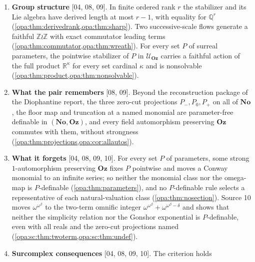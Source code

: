 \documentclass[11pt,oneside]{article}
\numberwithin{equation}{section}
\theoremstyle{definition}
\theoremstyle{remark}
\newcommand{\No}{\mathbf{No}}
\newcommand{\Oz}{\mathbf{Oz}}
\newcommand{\R}{\mathbb R}
\newcommand{\Q}{\mathbb Q}
\newcommand{\Z}{\mathbb Z}
\newcommand{\UU}{\mathcal U}
\newcommand{\Fix}{\operatorname{Fix}}
\newcommand{\Hahn}[2]{#1((t^{#2}))}
\newcommand{\src}[1]{\textup{\textsf{\small[#1]}}}
\begin{document}
\begin{enumerate}[label=\textup{(\arabic*)},leftmargin=*,itemsep=3pt]
$\Fix(\UU_\Oz)=\R$, also for all field automorphisms of $\No$ preserving $\Oz$
(\cref{opa:thm:fixed}). For every set $A$ of parameters the elementary shears
fixing $A$ have common fixed field $\Hahn\R{V_A}$, $V_A$ the rational span of
the supports (\cref{opa:thm:hull}). Binomial twists
$t^g\mapsto t^gF(t^\delta)^{\theta(g)}$ with an arbitrary profile $F$ have fixed
field $\Hahn k{\ker\theta}$, no nontrivial finite orbits and a relatively
algebraically closed fixed field
(\cref{opa:sc:thm:twists,opa:sc:thm:fixed,opa:sc:cor:relative}), and in
set-sized fields definable elements obey a
support bound (\cref{opa:sc:prop:dclset}) \src{10}.
\item \textbf{Group structure} \src{04, 08, 09}. In finite ordered rank $r$
the stabilizer and its Lie algebra have derived length at most $r-1$, with
equality for $\Q^r$ (\cref{opa:thm:derivedrank,opa:thm:sharp}). Two
successive-scale flows generate a faithful $\Z\wr\Z$ with exact commutator
leading terms (\cref{opa:thm:commutator,opa:thm:wreath}). For every set $P$
of surreal parameters, the pointwise stabilizer of $P$ in $\UU_\Oz$ carries a
faithful action of the full product $\R^\kappa$ for every set cardinal
$\kappa$ and is nonsolvable (\cref{opa:thm:product,opa:thm:nonsolvable}).
\item \textbf{What the pair remembers} \src{08, 09}. Beyond the
reconstruction package of the Diophantine report, the three zero-cut
projections $P_-,P_0,P_+$ on all of $\No$, the floor map and truncation at a
named monomial are parameter-free definable in $(\No,\Oz)$, and every field
automorphism preserving $\Oz$ commutes with them, without strongness
(\cref{opa:thm:projections,opa:cor:allautos}).
\item \textbf{What it forgets} \src{04, 08, 09, 10}. For every set $P$ of
parameters, some strong $1$-automorphism preserving $\Oz$ fixes $P$
pointwise and moves a Conway monomial to an infinite series; so neither the
monomial class nor the omega-map is $P$-definable
(\cref{opa:thm:parameters}), and no $P$-definable rule selects a
representative of each natural-valuation class (\cref{opa:thm:nosection}).
Source 10 moves $\omega^{\omega^\beta}$ to the two-term omnific integer
$\omega^{\omega^\beta}+\omega^{\omega^\beta-\delta}$ and shows that neither the
simplicity relation nor the Gonshor exponential is $P$-definable, even with all
reals and the zero-cut projections named
(\cref{opa:sc:thm:twoterm,opa:sc:thm:undef}).
\item \textbf{Surcomplex consequences} \src{04, 08, 09, 10}. The criterion holds

\end{enumerate}
\end{document}

